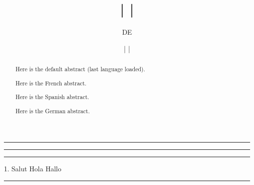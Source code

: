 \documentclass{article}
\title{\fra{Le document} | \esp{El document} | \deu{Ze document}}
\author{DE}
\date{\fra{\today} | \esp{\today} | \deu{\today}}
\begin{document}
\maketitle

\bigskip\hrule\bigskip

\begin{abstract}
Here is the default abstract (last language loaded).
\end{abstract}

\bigskip\hrule\bigskip

\begin{multicols}

\begin{francais}
\begin{abstract}
Here is the French abstract.
\end{abstract}
\end{francais}

\begin{espanol}
\begin{abstract}
Here is the Spanish abstract.
\end{abstract}
\end{espanol}

\begin{deutsch}
\begin{abstract}
Here is the German abstract.
\end{abstract}
\end{deutsch}

\end{multicols}

\bigskip\hrule\bigskip

1. \fr Salut \es Hola \de Hallo \zz

\bigskip\hrule\bigskip
\end{document}
